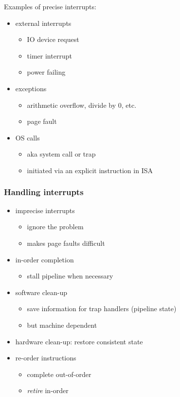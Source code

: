 \documentclass[12pt]{extarticle}
\begin{document}
	Examples of precise interrupts:

	\begin{itemize}
		\item external interrupts
		\begin{itemize}
			\item IO device request
			\item timer interrupt
			\item power failing
		\end{itemize}

		\item exceptions	
		\begin{itemize}
			\item arithmetic overflow, divide by 0, etc.
			\item page fault
		\end{itemize}

		\item OS calls
		\begin{itemize}
			\item aka system call or trap
			\item initiated via an explicit instruction in ISA
		\end{itemize}
	\end{itemize}

	\subsubsection{Handling interrupts}

	\begin{itemize}
		\item imprecise interrupts
		\begin{itemize}
			\item ignore the problem
			\item makes page faults difficult
		\end{itemize}

		\item in-order completion
		\begin{itemize}
			\item stall pipeline when necessary
		\end{itemize}

		\item software clean-up
		\begin{itemize}
			\item save information for trap handlers (pipeline state)
			\item but machine dependent
		\end{itemize}

		\item hardware clean-up: restore consistent state
		\item re-order instructions
		\begin{itemize}
			\item complete out-of-order
			\item \textit{retire} in-order
		\end{itemize}
	\end{itemize}
\end{document}
